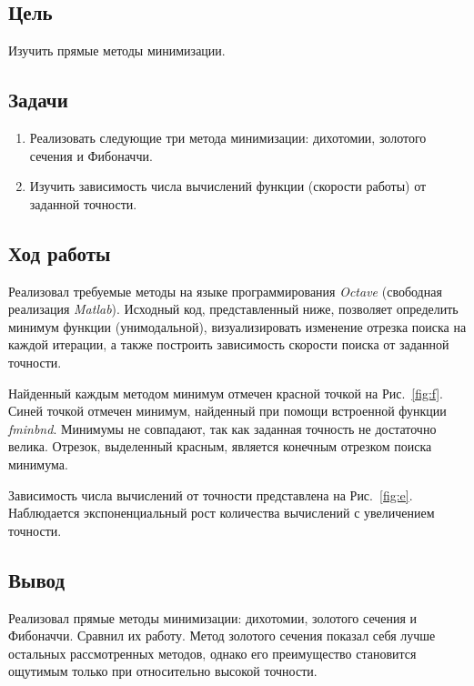 

 

\newcommand{\labn}{2}


\subsection*{Цель}

Изучить прямые методы минимизации.

\subsection*{Задачи}

\begin{enumerate}
	\item Реализовать следующие три метода минимизации: дихотомии, золотого сечения и Фибоначчи.
	\item Изучить зависимость числа вычислений функции (скорости работы) от заданной точности.
\end{enumerate}

\subsection*{Ход работы}

Реализовал требуемые методы на языке программирования \textit{Octave} (свободная реализация \textit{Matlab}). 
Исходный код, представленный ниже, позволяет определить минимум функции (унимодальной), 
визуализировать изменение отрезка поиска на каждой итерации, 
а также построить зависимость скорости поиска от заданной точности.

Найденный каждым методом минимум отмечен красной точкой на Рис.~\ref{fig:f}.
Синей точкой отмечен минимум, найденный при помощи встроенной функции \textit{fminbnd}.
Минимумы не совпадают, так как заданная точность не достаточно велика.
Отрезок, выделенный красным, является конечным отрезком поиска минимума.

Зависимость числа вычислений от точности представлена на Рис.~\ref{fig:e}. 
Наблюдается экспоненциальный рост количества вычислений с увеличением точности.

\subsection*{Вывод}

Реализовал прямые методы минимизации: дихотомии, золотого сечения и Фибоначчи. Сравнил их работу.
Метод золотого сечения показал себя лучше остальных рассмотренных методов, однако его преимущество
становится ощутимым только при относительно высокой точности.


